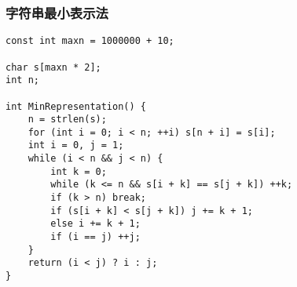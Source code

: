 \subsubsection{字符串最小表示法}
\begin{verbatim}
const int maxn = 1000000 + 10;

char s[maxn * 2];
int n;

int MinRepresentation() {
    n = strlen(s);
    for (int i = 0; i < n; ++i) s[n + i] = s[i];
    int i = 0, j = 1;
    while (i < n && j < n) {
        int k = 0;
        while (k <= n && s[i + k] == s[j + k]) ++k;
        if (k > n) break;
        if (s[i + k] < s[j + k]) j += k + 1;
        else i += k + 1;
        if (i == j) ++j;
    }
    return (i < j) ? i : j;
}
\end{verbatim}
